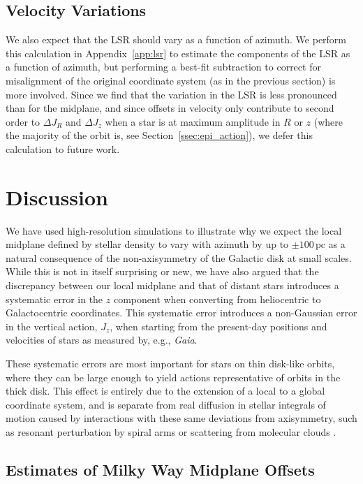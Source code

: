 \documentclass[twocolumn]{aastex62}
\newcommand{\pc}{\text{pc}}
\begin{document}
\subsection{Velocity Variations} \label{ssec:lsr_var}
We also expect that the LSR should vary as a function of azimuth. We perform
this calculation in Appendix~\ref{app:lsr} to estimate the components of the
LSR as a function of azimuth, but performing a best-fit subtraction to correct
for misalignment of the original coordinate system (as in the previous
section) is more involved. Since we find that the variation in the LSR is less
pronounced than for the midplane, and since offsets in velocity only
contribute to second order to $\Delta J_R$ and $\Delta J_z$ when a star is at
maximum amplitude in $R$ or $z$ (where the majority of the orbit is, see
Section~\ref{ssec:epi_action}), we defer this calculation to future work.

\section{Discussion} \label{sec:discussion}
We have used high-resolution simulations to illustrate why we expect the local
midplane defined by stellar density to vary with azimuth by up to $\pm
100\,\pc$ as a natural consequence of the non-axisymmetry of the Galactic disk
at small scales. While this is not in itself surprising or new, we have also
argued that the discrepancy between our local midplane and that of distant
stars introduces a systematic error in the $z$ component when converting from
heliocentric to Galactocentric coordinates. This systematic error introduces a
non-Gaussian error in the vertical action, $J_z$, when starting from the
present-day positions and velocities of stars as measured by, e.g.,
\textit{Gaia}.

These systematic errors are most important for stars on thin disk-like orbits,
where they can be large enough to yield actions representative of orbits in
the thick disk. This effect is entirely due to the extension of a local to a
global coordinate system, and is separate from real diffusion in stellar
integrals of motion caused by interactions with these same deviations from
axisymmetry, such as resonant perturbation by spiral arms or scattering from
molecular clouds \citep{2014RvMP...86....1S}.

\subsection{Estimates of Milky Way Midplane Offsets}
\end{document}
